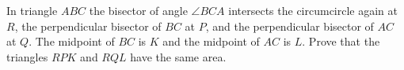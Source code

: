 In triangle $ABC$ the bisector of angle $\angle BCA$ intersects the circumcircle again at $R$, the perpendicular bisector of $BC$ at $P$, and the perpendicular bisector of $AC$ at $Q$.
The midpoint of $BC$ is $K$ and the midpoint of $AC$ is $L$.
Prove that the triangles $RPK$ and $RQL$ have the same area.
